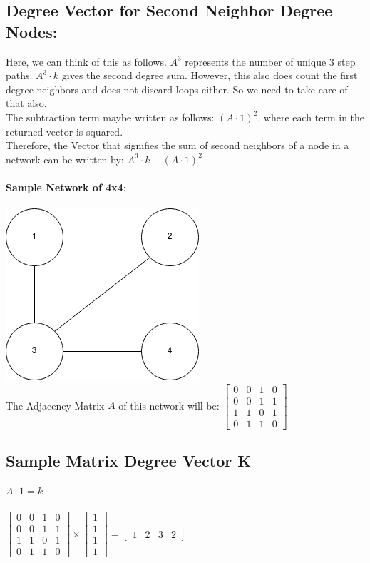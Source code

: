 \documentclass[11pt]{article}
\begin{document}
\subsection{Degree Vector for Second Neighbor Degree Nodes:}

Here, we can think of this as follows. $A^3$ represents the number of unique 3 step paths. $A^3 \cdot k$  gives the second degree sum. However, this also does count the first degree neighbors and does not discard loops either. So we need to take care of that also. 
\\
The subtraction term maybe written as follows: $(A\cdot1)^2$, where each term in the returned vector is squared.
\\
Therefore, the Vector that signifies the sum of second neighbors of a node in a network can be written by: $A^3 \cdot k - (A\cdot1)^2$ \\
\\
\textbf{Sample Network of 4x4}: \\ \\
\includegraphics[scale=0.5]{graph.png}
\\
\noindent The Adjacency Matrix $A$ of this network will be: 
$ \begin{bmatrix}
    0 & 0 & 1 & 0 \\
    0 & 0 & 1 & 1 \\
    1 & 1 & 0 & 1 \\
    0 & 1 & 1 & 0

\end{bmatrix}$

\subsection{Sample Matrix Degree Vector K}
$ A \cdot 1 = k$ \\ \\ 
$ \begin{bmatrix}
    0 & 0 & 1 & 0 \\
    0 & 0 & 1 & 1 \\
    1 & 1 & 0 & 1 \\
    0 & 1 & 1 & 0
\end{bmatrix}
\times
\begin{bmatrix}
    1 \\
    1 \\
    1 \\
    1 
\end{bmatrix}
=
\begin{bmatrix}
    1 & 2 & 3 & 2
\end{bmatrix}$
\end{document}
